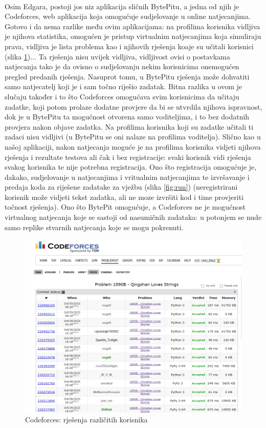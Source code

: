 		\noindent\\
			Osim Edgara, postoji jos niz aplikacija sličnih BytePitu, a jedna od njih je Codeforces, web aplikacija koja omogućuje sudjelovanje u online natjecanjima. Gotovo i da nema razlike među ovim aplikacijama: na profilima korisnika vidljiva je njihova statistika, omogućen je pristup virtualnim natjecanjima koja simuliraju prava, vidljiva je lista problema kao i njihovih rješenja koaje su učitali korisnici (slika \ref{fig:problemi})... Ta rješenja nisu uvijek vidljiva, vidljivost ovisi o postavkama natjecanja tako je da ovisno o sudjelovanju nekim korisnicima onemogućen pregled predanih rješenja. Nasuprot tomu, u BytePitu rješenja može dohvatiti samo natjecatelj koji je i sam točno riješio zadatak. Bitna razlika u ovom je slučaju također i to što Codeforces omogućava svim korisnicima da učitaju zadatke, koji potom prolaze dodatne provjere da bi se utvrdila njihova ispravnost, dok je u BytePitu ta mogućnost otvorena samo voditeljima, i to bez dodatnih provjera nakon objave zadatka. Na profilima korisnika koji su zadatke učitali ti zadaci nisu vidljivi (u BytePitu se oni nalaze na profilima voditelja).
		Slično kao u našoj aplikaciji, nakon natjecanja moguće je na profilima korisnika vidjeti njihova rješenja i rezultate testova ali čak i bez registracije: svaki korisnik vidi rješenja svakog korisnika te nije potrebna registracija. Ono što registracija omogućuje je, dakako, sudjelovanje u natjecanjima i vritualnim natjecanjima te izvršavanje i predaja koda za riješene zadatake za vježbu (slika \ref{fig:run}) (neregistrirani korisnik može vidjeti tekst zadatka, ali ne moze izvršiti kod i time provjeriti točnost rješenja). Ono što BytePit omogućuje, a Codeforces ne je mogućnost virtualnog natjecanja koje se sastoji od nasumičnih zadataka: u potonjem se nude samo replike stvarnih natjecanja koje se mogu pokrenuti. \\
		
			\begin{figure}[H]
			\includegraphics[scale=0.4]{slike/cf1}
			\centering
			\caption{Codeforces: rješenja različitih korisnika}
			\label{fig:problemi}
		\end{figure}
		
